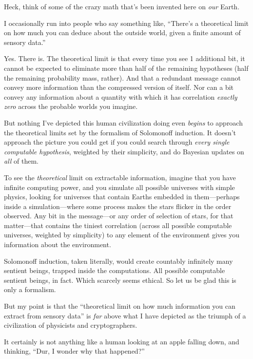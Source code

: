 {
 Heck, think of some of the crazy math that's been
invented here on \textit{our} Earth.}

{
 I occasionally run into people who say something like,
``There's a theoretical limit on how
much you can deduce about the outside world, given a finite amount of
sensory data.''}

{
 Yes. There is. The theoretical limit is that every time you see 1
additional bit, it cannot be expected to eliminate more than half of
the remaining hypotheses (half the remaining probability mass, rather).
And that a redundant message cannot convey more information than the
compressed version of itself. Nor can a bit convey any information
about a quantity with which it has correlation \textit{exactly zero}
across the probable worlds you imagine.}

{
 But nothing I've depicted this human civilization
doing even \textit{begins} to approach the theoretical limits set by
the formalism of Solomonoff induction. It doesn't
approach the picture you could get if you could search through
\textit{every single computable hypothesis}, weighted by their
simplicity, and do Bayesian updates on \textit{all} of them.}

{
 To see the \textit{theoretical} limit on extractable information,
imagine that you have infinite computing power, and you simulate all
possible universes with simple physics, looking for universes that
contain Earths embedded in them---perhaps inside a simulation---where
some process makes the stars flicker in the order observed. Any bit in
the message---or any order of selection of stars, for that
matter---that contains the tiniest correlation (across all possible
computable universes, weighted by simplicity) to any element of the
environment gives you information about the environment.}

{
 Solomonoff induction, taken literally, would create countably
infinitely many sentient beings, trapped inside the computations. All
possible computable sentient beings, in fact. Which scarcely seems
ethical. So let us be glad this is only a formalism.}

{
 But my point is that the ``theoretical limit on
how much information you can extract from sensory
data'' is \textit{far} above what I have depicted as
the triumph of a civilization of physicists and cryptographers.}

{
 It certainly is not anything like a human looking at an apple
falling down, and thinking, ``Dur, I wonder why that
happened?''}

